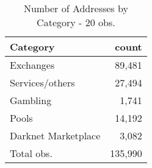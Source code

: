 \begin{table}[ht]
\centering
\begin{tabular}{lr}
  \hline
Category & count \\ 
  \hline
Exchanges & 89,481 \\ 
  Services/others & 27,494 \\ 
  Gambling & 1,741 \\ 
  Pools & 14,192 \\ 
  Darknet Marketplace & 3,082 \\ 
  Total obs. & 135,990 \\ 
   \hline
\end{tabular}
\caption{Number of Addresses by Category - 20 obs.} 
\label{n_cat_20obs}
\end{table}
